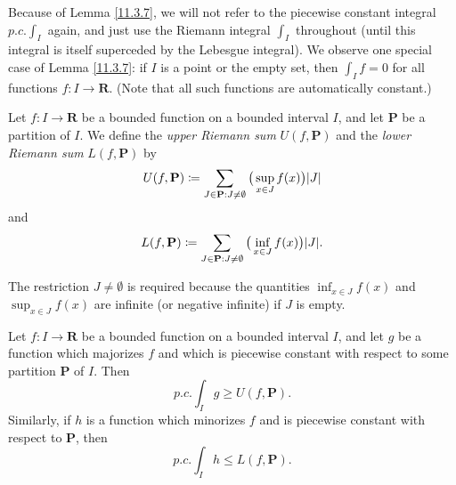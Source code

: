 \begin{remark}\label{11.3.8}
    Because of Lemma \ref{11.3.7}, we will not refer to the piecewise constant integral \(p.c. \int_I\) again, and just use the Riemann integral \(\int_I\) throughout
    (until this integral is itself superceded by the Lebesgue integral).
    We observe one special case of Lemma \ref{11.3.7}:
    if \(I\) is a point or the empty set, then \(\int_I f = 0\) for all functions \(f : I \to \mathbf{R}\).
    (Note that all such functions are automatically constant.)
\end{remark}

\begin{definition}\label{11.3.9}
    Let \(f : I \to \mathbf{R}\) be a bounded function on a bounded interval \(I\), and let \(\mathbf{P}\) be a partition of \(I\).
    We define the \emph{upper Riemann sum} \(U(f, \mathbf{P})\) and the \emph{lower Riemann sum} \(L(f, \mathbf{P})\) by
    \[
        U(f, \mathbf{P}) \coloneqq \sum_{J \in \mathbf{P} : J \neq \emptyset} \big(\sup_{x \in J} f(x)\big) \abs*{J}
    \]
    and
    \[
        L(f, \mathbf{P}) \coloneqq \sum_{J \in \mathbf{P} : J \neq \emptyset} \big(\inf_{x \in J} f(x)\big) \abs*{J}.
    \]
\end{definition}

\begin{remark}\label{11.3.10}
    The restriction \(J \neq \emptyset\) is required because the quantities \(\inf_{x \in J} f(x)\) and \(\sup_{x \in J} f(x)\) are infinite (or negative infinite) if \(J\) is empty.
\end{remark}

\begin{lemma}\label{11.3.11}
    Let \(f : I \to \mathbf{R}\) be a bounded function on a bounded interval \(I\), and let \(g\) be a function which majorizes \(f\) and which is piecewise constant with respect to some partition \(\mathbf{P}\) of \(I\).
    Then
    \[
        p.c. \int_I g \geq U(f, \mathbf{P}).
    \]
    Similarly, if \(h\) is a function which minorizes \(f\) and is piecewise constant with respect to \(\mathbf{P}\), then
    \[
        p.c. \int_I h \leq L(f, \mathbf{P}).
    \]
\end{lemma}

